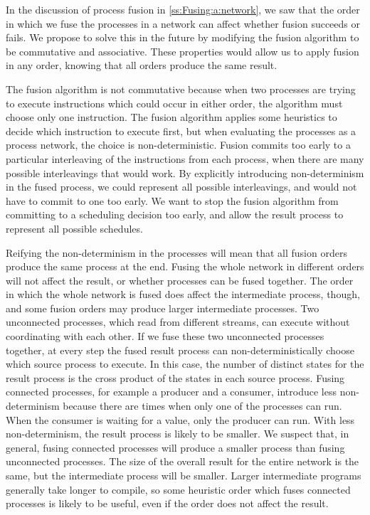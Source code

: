 In the discussion of process fusion in \cref{ss:Fusing:a:network}, we saw that the order in which we fuse the processes in a network can affect whether fusion succeeds or fails.
We propose to solve this in the future by modifying the fusion algorithm to be commutative and associative.
These properties would allow us to apply fusion in any order, knowing that all orders produce the same result.

The fusion algorithm is not commutative because when two processes are trying to execute instructions which could occur in either order, the algorithm must choose only one instruction.
The fusion algorithm applies some heuristics to decide which instruction to execute first, but when evaluating the processes as a process network, the choice is non-deterministic.
Fusion commits too early to a particular interleaving of the instructions from each process, when there are many possible interleavings that would work.
By explicitly introducing non-determinism in the fused process, we could represent all possible interleavings, and would not have to commit to one too early.
We want to stop the fusion algorithm from committing to a scheduling decision too early, and allow the result process to represent all possible schedules.

Reifying the non-determinism in the processes will mean that all fusion orders produce the same process at the end.
Fusing the whole network in different orders will not affect the result, or whether processes can be fused together.
The order in which the whole network is fused does affect the intermediate process, though, and some fusion orders may produce larger intermediate processes.
Two unconnected processes, which read from different streams, can execute without coordinating with each other.
If we fuse these two unconnected processes together, at every step the fused result process can non-deterministically choose which source process to execute.
In this case, the number of distinct states for the result process is the cross product of the states in each source process.
Fusing connected processes, for example a producer and a consumer, introduce less non-determinism because there are times when only one of the processes can run.
When the consumer is waiting for a value, only the producer can run.
With less non-determinism, the result process is likely to be smaller.
We suspect that, in general, fusing connected processes will produce a smaller process than fusing unconnected processes.
The size of the overall result for the entire network is the same, but the intermediate process will be smaller.
Larger intermediate programs generally take longer to compile, so some heuristic order which fuses connected processes is likely to be useful, even if the order does not affect the result.


